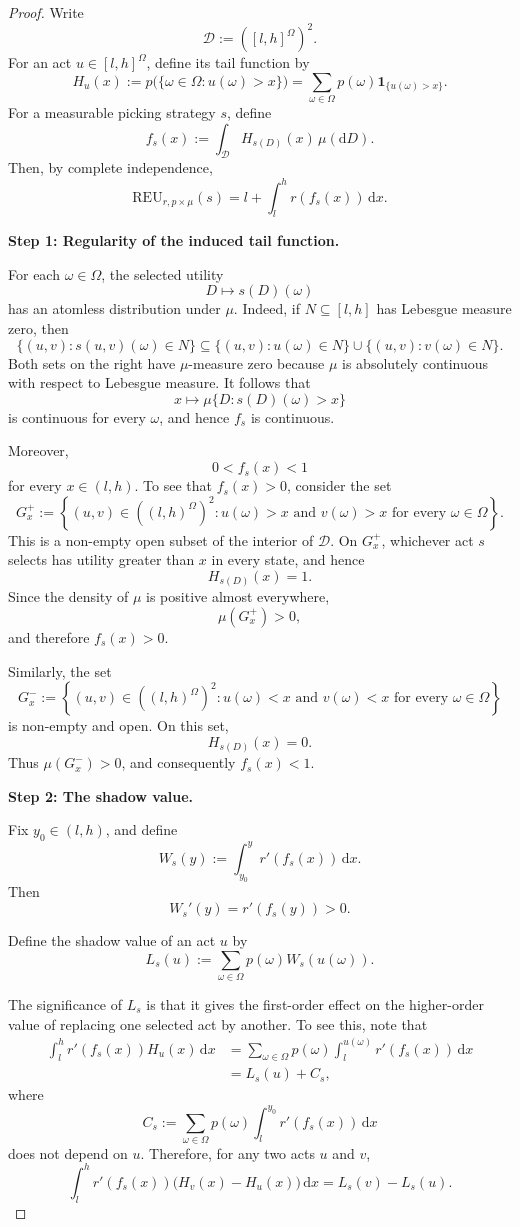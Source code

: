 \documentclass[a4paper,final]{article}
\newcommand\REU{\mathrm{REU}}
\newenvironment{CCM rewritten}
{\begingroup\color{blue}} %
{\endgroup}              %
\begin{document}
\begin{proof}
Write
\[
\mathcal D:=([l,h]^\Omega)^2.
\]
For an act \(u\in[l,h]^\Omega\), define its tail function by
\[
H_u(x)
:=
p\bigl(\{\omega\in\Omega:u(\omega)>x\}\bigr)
=
\sum_{\omega\in\Omega}
p(\omega)\mathbf 1_{\{u(\omega)>x\}}.
\]
For a measurable picking strategy \(s\), define
\[
f_s(x)
:=
\int_{\mathcal D}H_{s(D)}(x)\,\mu(\mathrm dD).
\]
Then, by complete independence,
\[
\REU_{r,p\times\mu}(s)
=
l+\int_l^h r(f_s(x))\,\mathrm dx.
\]

\medskip
\noindent
\textbf{Step 1: Regularity of the induced tail function.}

For each \(\omega\in\Omega\), the selected utility
\[
D\longmapsto s(D)(\omega)
\]
has an atomless distribution under \(\mu\). Indeed, if
\(N\subseteq[l,h]\) has Lebesgue measure zero, then
\[
\{(u,v):s(u,v)(\omega)\in N\}
\subseteq
\{(u,v):u(\omega)\in N\}
\cup
\{(u,v):v(\omega)\in N\}.
\]
Both sets on the right have \(\mu\)-measure zero because \(\mu\) is
absolutely continuous with respect to Lebesgue measure. It follows that
\[
x\longmapsto
\mu\{D:s(D)(\omega)>x\}
\]
is continuous for every \(\omega\), and hence \(f_s\) is continuous.

Moreover,
\[
0<f_s(x)<1
\]
for every \(x\in(l,h)\). To see that \(f_s(x)>0\), consider the set
\[
G_x^+
:=
\left\{
(u,v)\in((l,h)^\Omega)^2:
u(\omega)>x
\text{ and }
v(\omega)>x
\text{ for every }\omega\in\Omega
\right\}.
\]
This is a non-empty open subset of the interior of \(\mathcal D\). On
\(G_x^+\), whichever act \(s\) selects has utility greater than \(x\)
in every state, and hence
\[
H_{s(D)}(x)=1.
\]
Since the density of \(\mu\) is positive almost everywhere,
\[
\mu(G_x^+)>0,
\]
and therefore \(f_s(x)>0\).

Similarly, the set
\[
G_x^-
:=
\left\{
(u,v)\in((l,h)^\Omega)^2:
u(\omega)<x
\text{ and }
v(\omega)<x
\text{ for every }\omega\in\Omega
\right\}
\]
is non-empty and open. On this set,
\[
H_{s(D)}(x)=0.
\]
Thus \(\mu(G_x^-)>0\), and consequently \(f_s(x)<1\).

\medskip
\noindent
\textbf{Step 2: The shadow value.}

Fix \(y_0\in(l,h)\), and define
\[
W_s(y)
:=
\int_{y_0}^{y}r'(f_s(x))\,\mathrm dx.
\]
Then
\[
W_s'(y)=r'(f_s(y))>0.
\]

Define the shadow value of an act \(u\) by
\[
L_s(u)
:=
\sum_{\omega\in\Omega}
p(\omega)W_s(u(\omega)).
\]

The significance of \(L_s\) is that it gives the first-order effect on
the higher-order value of replacing one selected act by another. To
see this, note that
\begin{align}
\int_l^h r'(f_s(x))H_u(x)\,\mathrm dx
&=
\sum_{\omega\in\Omega}
p(\omega)
\int_l^{u(\omega)}
r'(f_s(x))\,\mathrm dx
\\
&=
L_s(u)+C_s,
\end{align}
where
\[
C_s
:=
\sum_{\omega\in\Omega}
p(\omega)
\int_l^{y_0}r'(f_s(x))\,\mathrm dx
\]
does not depend on \(u\). Therefore, for any two acts \(u\) and \(v\),
\[
\int_l^h
r'(f_s(x))
\bigl(H_v(x)-H_u(x)\bigr)
\,\mathrm dx
=
L_s(v)-L_s(u).
\]


\end{proof}
\end{document}
